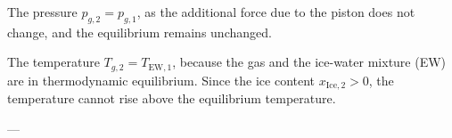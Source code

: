 The pressure \( p_{g,2} = p_{g,1} \), as the additional force due to the piston does not change, and the equilibrium remains unchanged.  

The temperature \( T_{g,2} = T_{\text{EW},1} \), because the gas and the ice-water mixture (EW) are in thermodynamic equilibrium. Since the ice content \( x_{\text{Ice},2} > 0 \), the temperature cannot rise above the equilibrium temperature.  

---